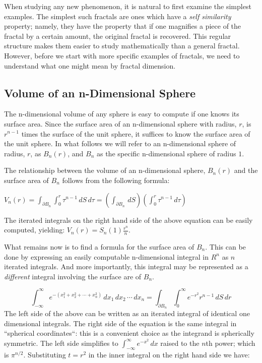 {When studying any new phenomenon, it is natural to first examine the
simplest examples. The simplest such fractals are ones which have a
{\it self similarity} property; namely, they have the property that if
one magnifies a piece of the fractal by a certain amount, the original
fractal is recovered. This regular structure makes them easier to
study mathematically than a general fractal. However, before we start
with more specific examples of fractals, we need to understand what 
one might mean by fractal dimension.

\subsection{Volume of an n-Dimensional Sphere}
The n-dimensional volume of any sphere is easy to compute if one 
knows its surface area. Since the surface area of an n-dimensional sphere 
with radius, $r$, is $r^{n-1}$ times the surface of the unit sphere, 
it suffices to know the surface area of the unit sphere.
In what follows we will refer to an n-dimensional sphere of radius, $r$, 
as $B_n(r)$, and $B_n$ as the specific n-dimensional sphere of radius $1$.

The relationship between the volume of an n-dimensional sphere, $B_n(r)$ 
and the surface area of $B_n$ follows from the following formula:%

${V}_n(r) =  \int_{\partial B_n} \int_0^r \tau^{n-1} \,dS \,d\tau = \left(\int_{\partial B_n} \, dS\right) \left( \int_0^r \tau^{n-1} \, d\tau \right)$

The iterated integrals on the right hand side of the above equation can 
be easily computed, yielding: ${V}_n(r) = {S}_n(1) \frac{r^n}{n}$.

What remains now is to find a formula for the surface area of $B_n.$
This can be done by expressing an easily computable 
n-dimensional integral in $R^n$ as $n$ iterated integrals. 
And more importantly, this integral may be represented as a {\it different\/} 
integral involving the surface are of $B_n$.

$$
\int_{-\infty}^{\infty} e^{-(x_1^2 + x_2^2 + \cdots + x_n^2)} \, dx_1\, dx_2
\, \cdots \, dx_n = \int_{\partial B_n} \int_0^\infty e^{-r^2} r^{n-1} \,
dS\, dr
$$
The left side of the above can be written as an iterated integral of identical 
one dimensional integrals. The right side of the equation is the same 
integral in ``spherical coordinates``: this is a convenient choice as 
the integrand is spherically symmetric. The left side simplifies to 
$\int_{-\infty}^{\infty} e^{-x^2} \, dx$ raised to the $n$th power;
which is $\pi^{n/2}$. Substituting $t = r^2$ in the inner integral on
the right hand side we have:

}
